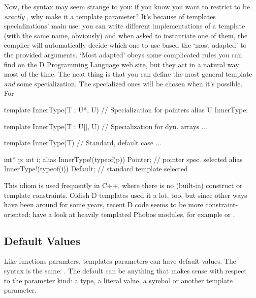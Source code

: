 Now, the  syntax may seem strange to you: if you know you want to restrict  to be \emph{exactly} , why make it a template parameter? It's because of templates specializations' main use: you can write different implementations of a template (with the same name, obviously) and when asked to instantiate one of them, the compiler will automatically decide which one to use based the `most adapted' to the provided arguments. `Most adapted' obeys some complicated rules you can find on the D Programming Language web site, but they act in a natural way most of the time. The neat thing is that you can define the most general template \emph{and} some specialization. The specialized ones will be chosen when it's possible. For 

\begin{dcode}
template InnerType(T : U*, U) // Specialization for pointers
{
    alias U InnerType;
}

template InnerType(T : U[], U) // Specialization for dyn. arrays
{ ... }

template InnerType(T) // Standard, default case
{ ... }

int* p;
int i; 
alias InnerType!(typeof(p)) Pointer; // pointer spec. selected
alias InnerType!(typeof(i)) Default; // standard template selected
\end{dcode}

This idiom is used frequently in C++, where there is no (built-in)  construct or template constraints. Oldish D templates used it a lot, too, but since other ways have been around for some years, recent D code seems to be more constraint-oriented: have a look at heavily templated Phobos modules, for example  or .


\subsection{Default Values}\label{default}

Like functions paramters, templates parameters can have default values. The syntax is the same: . The default can be anything that makes sense with respect to the parameter kind: a type, a literal value, a symbol or another template parameter.

